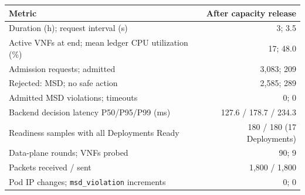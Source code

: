 \begin{tabularx}{\columnwidth}{@{}>{\raggedright\arraybackslash}Xr@{}}
\toprule
Metric & After capacity release \\
\midrule
Duration (h); request interval (s) & 3; 3.5 \\
Active VNFs at end; mean ledger CPU utilization (\%) & 17; 48.0 \\
Admission requests; admitted & 3,083; 209 \\
Rejected: MSD; no safe action & 2,585; 289 \\
Admitted MSD violations; timeouts & 0; 0 \\
Backend decision latency P50/P95/P99 (ms) & 127.6 / 178.7 / 234.3 \\
Readiness samples with all Deployments Ready & 180 / 180 (17 Deployments) \\
Data-plane rounds; VNFs probed & 90; 9 \\
Packets received / sent & 1,800 / 1,800 \\
Pod IP changes; \texttt{msd\_violation} increments & 0; 0 \\
\bottomrule
\end{tabularx}

